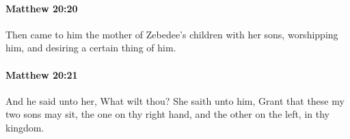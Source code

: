 		\paragraph{Matthew 20:20} %
			\label{MATTHEW-20-20}

			Then came to him the mother of Zebedee's children with her sons, worshipping him, and desiring a certain thing of him.

			\begin{framed}
			\scriptsize
				\begin{compactdesc}
					\item[SBLG] 
				\end{compactdesc}
			\end{framed}

		\paragraph{Matthew 20:21} %
			\label{MATTHEW-20-21}

			And he said unto her, What wilt thou? She saith unto him, Grant that these my two sons may sit, the one on thy right hand, and the other on the left, in thy kingdom.

